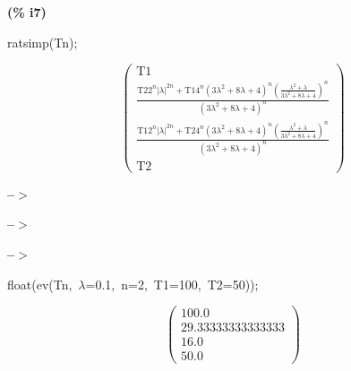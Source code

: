 \documentclass[fleqn]{article}
\begin{document}
\noindent
\begin{minipage}[t]{4.000000em}\color{red}\bfseries
(\% i7)	
\end{minipage}
\begin{minipage}[t]{\textwidth}\color{blue}
ratsimp(Tn);
\end{minipage}
\[\displaystyle \tag{\% o7} 
\begin{pmatrix}\ensuremath{\mathrm{T1}}\\
\frac{\ensuremath{\mathrm{T2}} {{2}^{n}} {{\left| \lambda \right| }^{2 n}}+\ensuremath{\mathrm{T1}} {{4}^{n}} {{\left( 3 {{\lambda }^{2}}+8 \lambda +4\right) }^{n}} {{\left( \frac{{{\lambda }^{2}}+\lambda }{3 {{\lambda }^{2}}+8 \lambda +4}\right) }^{n}}}{{{\left( 3 {{\lambda }^{2}}+8 \lambda +4\right) }^{n}}}\\
\frac{\ensuremath{\mathrm{T1}} {{2}^{n}} {{\left| \lambda \right| }^{2 n}}+\ensuremath{\mathrm{T2}} {{4}^{n}} {{\left( 3 {{\lambda }^{2}}+8 \lambda +4\right) }^{n}} {{\left( \frac{{{\lambda }^{2}}+\lambda }{3 {{\lambda }^{2}}+8 \lambda +4}\right) }^{n}}}{{{\left( 3 {{\lambda }^{2}}+8 \lambda +4\right) }^{n}}}\\
\ensuremath{\mathrm{T2}}\end{pmatrix}\mbox{}
\]


\noindent
\begin{minipage}[t]{4.000000em}\color{red}\bfseries
 --\ensuremath{\ensuremath{>}}	
\end{minipage}
\begin{minipage}[t]{\textwidth}\color{blue}

\end{minipage}

\noindent%



\noindent
\begin{minipage}[t]{4.000000em}\color{red}\bfseries
 --\ensuremath{\ensuremath{>}}	
\end{minipage}
\begin{minipage}[t]{\textwidth}\color{blue}

\end{minipage}

\noindent%



\noindent
\begin{minipage}[t]{4.000000em}\color{red}\bfseries
 --\ensuremath{\ensuremath{>}}	
\end{minipage}
\begin{minipage}[t]{\textwidth}\color{blue}
float(ev(Tn,\ \ensuremath{\lambda}=0.1,\ n=2,\ T1=100,\ T2=50));
\end{minipage}
\[\displaystyle \tag{\% o34} 
\begin{pmatrix}100.0\\
29.33333333333333\\
16.0\\
50.0\end{pmatrix}\mbox{}
\]
\end{document}
